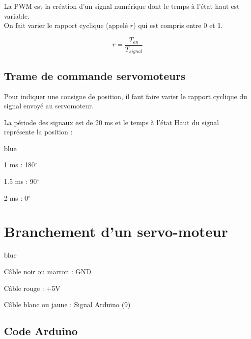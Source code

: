 La PWM est la création d'un signal numérique dont le temps à l'état haut est variable.\\
On fait varier le rapport cyclique (appelé $r$) qui est compris entre 0 et 1.

$$ r = \frac{T_{on}}{T_{signal}} $$



\subsection{Trame de commande servomoteurs}

Pour indiquer une consigne de position, il faut faire varier le rapport cyclique 
du signal envoyé au servomoteur.

La période des signaux est de 20 ms et le temps à l'état Haut du signal représente la position : 

\begin{items}{blue}{\Triangle}
\item 1 ms : 180$^\circ$
\item 1.5 ms : 90$^\circ$
\item 2 ms : 0$^\circ$
\end{items}


\section{Branchement d'un servo-moteur}

\begin{items}{blue}{\Bullet}
  \item Câble noir ou marron : GND 
  \item Câble rouge : +5V
  \item Câble blanc ou jaune : Signal Arduino (9)
\end{items}



\subsection{Code Arduino}


